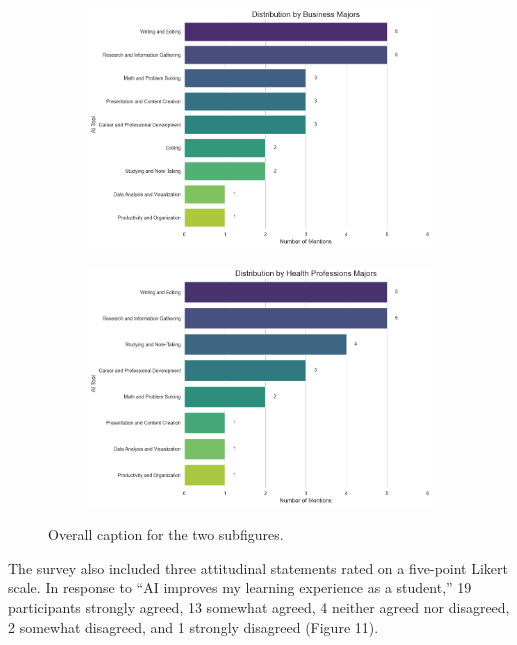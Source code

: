 \documentclass[12pt]{article}
\begin{document}
\begin{figure}[H]
\begin{subfigure}[b]{0.45\textwidth}
    \includegraphics[width=\textwidth]{fig6-3.png} %
    \label{fig:subfig1b}
  \end{subfigure}
  \hfill %
  \begin{subfigure}[b]{0.45\textwidth}
    \includegraphics[width=\textwidth]{fig6-4.png} %
    \label{fig:subfig1b}
  \end{subfigure}
  \caption{Overall caption for the two subfigures.}
  \label{fig:subfigures1}
\end{figure}


The survey also included three attitudinal statements rated on a five-point Likert scale. In response to “AI improves my learning experience as a student,” 19 participants strongly agreed, 13 somewhat agreed, 4 neither agreed nor disagreed, 2 somewhat disagreed, and 1 strongly disagreed (Figure 11).
\end{document}
